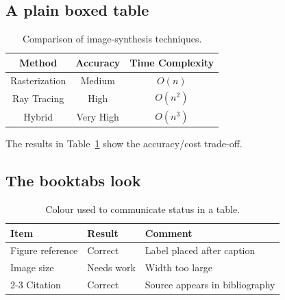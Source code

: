 \documentclass[11pt,a4paper]{article}
\theoremstyle{definition}                   %
\begin{document}
\subsection{A plain boxed table}
\begin{table}[H]           %
    \centering             %
    \caption{Comparison of image-synthesis techniques.}  %
    \label{tab:plain}      %
    \begin{tabular}{|c|c|c|}
        \hline
        Method        & Accuracy & Time Complexity \\
        \hline
        Rasterization & Medium   & $O(n)$   \\
        \hline
        Ray Tracing   & High     & $O(n^2)$ \\
        \hline
        Hybrid        & Very High & $O(n^3)$ \\
        \hline
    \end{tabular}
\end{table}

%
The results in Table~\ref{tab:plain} show the accuracy/cost trade-off.

\subsection{The booktabs look}
%
\begin{table}[H]
    \centering
    \caption{Colour used to communicate status in a table.}
    \label{tab:booktabs}
    \begin{tabular}{lll}
        \toprule
        Item             & Result     & Comment \\
        \midrule
        Figure reference & \cellcolor{softgreen}Correct    & Label placed after caption \\
        Image size       & \cellcolor{softred}Needs work   & Width too large \\
        \cmidrule(lr){2-3}
        Citation         & \cellcolor{softgreen}Correct    & Source appears in bibliography \\
        \bottomrule
    \end{tabular}
\end{table}
\end{document}

